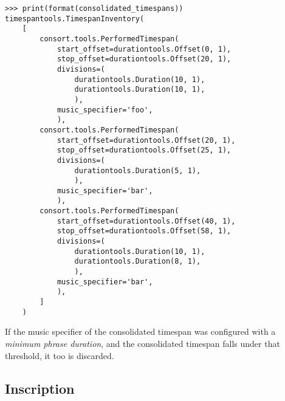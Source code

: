 \begin{abjadbookoutput}
\begin{singlespacing}
\vspace{-0.5\baselineskip}
\begin{lstlisting}
>>> print(format(consolidated_timespans))
timespantools.TimespanInventory(
    [
        consort.tools.PerformedTimespan(
            start_offset=durationtools.Offset(0, 1),
            stop_offset=durationtools.Offset(20, 1),
            divisions=(
                durationtools.Duration(10, 1),
                durationtools.Duration(10, 1),
                ),
            music_specifier='foo',
            ),
        consort.tools.PerformedTimespan(
            start_offset=durationtools.Offset(20, 1),
            stop_offset=durationtools.Offset(25, 1),
            divisions=(
                durationtools.Duration(5, 1),
                ),
            music_specifier='bar',
            ),
        consort.tools.PerformedTimespan(
            start_offset=durationtools.Offset(40, 1),
            stop_offset=durationtools.Offset(58, 1),
            divisions=(
                durationtools.Duration(10, 1),
                durationtools.Duration(8, 1),
                ),
            music_specifier='bar',
            ),
        ]
    )
\end{lstlisting}
\end{singlespacing}
\end{abjadbookoutput}

\noindent If the music specifier of the consolidated timespan was configured
with a \emph{minimum phrase duration}, and the consolidated timespan falls
under that threshold, it too is discarded.

\subsection{Inscription}
\label{ssec:inscription}

